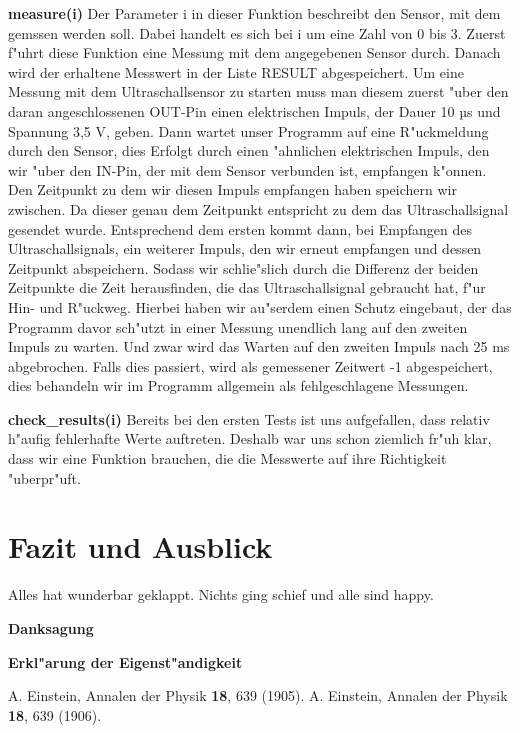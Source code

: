 \documentclass[a4paper,12pt]{article}
\begin{document}
\textbf{measure(i)}
\newline
Der Parameter i in dieser Funktion beschreibt den Sensor, mit dem gemssen werden soll.
Dabei handelt es sich bei i um eine Zahl von 0 bis 3.
Zuerst f"uhrt diese Funktion eine Messung mit dem angegebenen Sensor durch.
Danach wird der erhaltene Messwert in der Liste RESULT abgespeichert.
Um eine Messung mit dem Ultraschallsensor zu starten muss man diesem zuerst "uber den daran angeschlossenen OUT-Pin einen elektrischen Impuls, der Dauer 10 µs und Spannung 3,5 V, geben.
Dann wartet unser Programm auf eine R"uckmeldung durch den Sensor, dies Erfolgt durch einen "ahnlichen elektrischen Impuls, den wir "uber den IN-Pin, der mit dem Sensor verbunden ist, empfangen k"onnen.
Den Zeitpunkt zu dem wir diesen Impuls empfangen haben speichern wir zwischen.
Da dieser genau dem Zeitpunkt entspricht zu dem das Ultraschallsignal gesendet wurde.
Entsprechend dem ersten kommt dann, bei Empfangen des Ultraschallsignals, ein weiterer Impuls, den wir erneut empfangen und dessen Zeitpunkt abspeichern.
Sodass wir schlie"slich durch die Differenz der beiden Zeitpunkte die Zeit herausfinden, die das Ultraschallsignal gebraucht hat, f"ur Hin- und R"uckweg.
Hierbei haben wir au"serdem einen Schutz eingebaut, der das Programm davor sch"utzt in einer Messung unendlich lang auf den zweiten Impuls zu warten.
Und zwar wird das Warten auf den zweiten Impuls nach 25 ms abgebrochen.
Falls dies passiert, wird als gemessener Zeitwert -1 abgespeichert, dies behandeln wir im Programm allgemein als fehlgeschlagene Messungen.

\medskip

\textbf{check\_results(i)}
\newline
Bereits bei den ersten Tests ist uns aufgefallen, dass relativ h"aufig fehlerhafte Werte auftreten.
Deshalb war uns schon ziemlich fr"uh klar, dass wir eine Funktion brauchen, die die Messwerte auf ihre Richtigkeit "uberpr"uft.

\section{Fazit und Ausblick}\label{sec3}

Alles hat wunderbar geklappt. Nichts ging schief und alle sind happy.


\bigskip


{\large\bf Danksagung}

\bigskip


{\large\bf Erkl"arung der Eigenst"andigkeit}

\bigskip


\begin{thebibliography}{99}
	\itemsep-2pt \small\frenchspacing
	A. Einstein, Annalen der Physik {\bf 18}, 639 (1905).
	\newline
	A. Einstein, Annalen der Physik {\bf 18}, 639 (1906).
\end{thebibliography}
\end{document}
